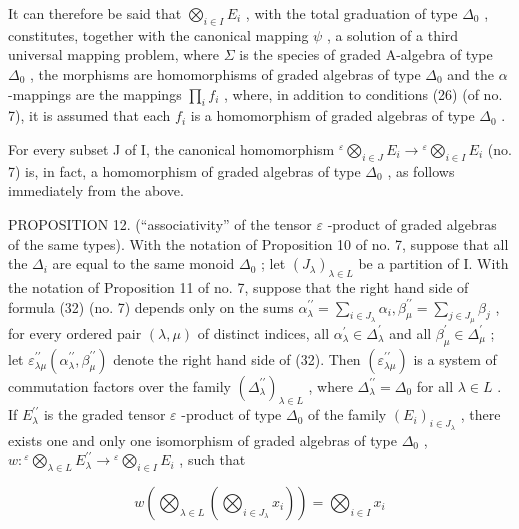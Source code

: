 It can therefore be said that \(\bigotimes_{i\in I}E_i\) , with the total graduation of type \(\Delta_0\) , constitutes, together with the canonical mapping \(\psi\) , a solution of a third universal mapping problem, where \(\Sigma\) is the species of graded A-algebra of type \(\Delta_0\) , the morphisms are homomorphisms of graded algebras of type \(\Delta_0\) and the \(\alpha\) -mappings are the mappings \(\prod_{i}f_{i}\) , where, in addition to conditions (26) (of no. 7), it is assumed that each \(f_{i}\) is a homomorphism of graded algebras of type \(\Delta_0\) .

For every subset J of I, the canonical homomorphism \({}^{\varepsilon}\bigotimes_{i\in J}E_i\to {}^{\varepsilon}\bigotimes_{i\in I}E_i\) (no. 7) is, in fact, a homomorphism of graded algebras of type \(\Delta_0\) , as follows immediately from the above.

PROPOSITION 12. (``associativity'' of the tensor \(\varepsilon\) -product of graded algebras of the same types). With the notation of Proposition 10 of no. 7, suppose that all the \(\Delta_{i}\) are equal to the same monoid \(\Delta_{0}\) ; let \((J_{\lambda})_{\lambda \in L}\) be a partition of I. With the notation of Proposition 11 of no. 7, suppose that the right hand side of formula (32) (no. 7) depends only on the sums \(\alpha_{\lambda}^{\prime \prime} = \sum_{i \in J_{\lambda}} \alpha_{i}, \beta_{\mu}^{\prime \prime} = \sum_{j \in J_{\mu}} \beta_{j}\) , for every ordered pair \((\lambda, \mu)\) of distinct indices, all \(\alpha_{\lambda}^{\prime} \in \Delta_{\lambda}^{\prime}\) and all \(\beta_{\mu}^{\prime} \in \Delta_{\mu}^{\prime}\) ; let \(\varepsilon_{\lambda \mu}^{\prime \prime}(\alpha_{\lambda}^{\prime \prime}, \beta_{\mu}^{\prime \prime})\) denote the right hand side of (32). Then \((\varepsilon_{\lambda \mu}^{\prime \prime})\) is a system of commutation factors over the family \((\Delta_{\lambda}^{\prime \prime})_{\lambda \in L}\) , where \(\Delta_{\lambda}^{\prime \prime} = \Delta_{0}\) for all \(\lambda \in L\) . If \(E_{\lambda}^{\prime \prime}\) is the graded tensor \(\varepsilon\) -product of type \(\Delta_{0}\) of the family \((E_{i})_{i \in J_{\lambda}}\) , there exists one and only one isomorphism of graded algebras of type \(\Delta_{0}\) , \(w: {}^{\varepsilon}\bigotimes_{\lambda \in L} E_{\lambda}^{\prime \prime} \to {}^{\varepsilon}\bigotimes_{i \in I} E_{i}\) , such that

\[
w \left(\bigotimes_ {\lambda \in L} \left(\bigotimes_ {i \in J _ {\lambda}} x _ {i}\right)\right) = \bigotimes_ {i \in I} x _ {i}\tag{35}
\]

